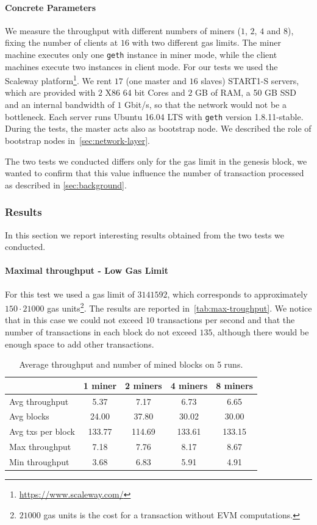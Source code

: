 \paragraph{Concrete Parameters}
We measure the throughput with different numbers of miners ($1$, $2$, $4$ and
$8$), fixing the number of clients at $16$ with two different gas limits. The
miner machine executes only one \texttt{geth} instance in miner mode, while the
client machines execute two instances in client mode. For our tests we used the
Scaleway platform\footnote{\url{https://www.scaleway.com/}}. We rent $17$ (one
master and $16$ slaves) START1-S servers, which are provided with $2$ X86 64 bit
Cores and $2$ GB of RAM, a 50 GB SSD and an internal bandwidth of $1$ Gbit/s, so
that the network would not be a bottleneck. Each server runs Ubuntu 16.04 LTS
with \texttt{geth} version 1.8.11-stable. During the tests, the master acts also
as bootstrap node. We described the role of bootstrap nodes
in~\autoref{sec:network-layer}.

The two tests we conducted differs only for the gas limit in the genesis block,
we wanted to confirm that this value influence the number of transaction
processed as described in \autoref{sec:background}.


\subsubsection{Results}

In this section we report interesting results obtained from the two tests we
conducted.

\paragraph{Maximal throughput - Low Gas Limit}
\label{sec:max-troughput}
For this test we used a gas limit of $3141592$, which corresponds to
approximately $150 \cdot 21000$ gas units\footnote{$21000$ gas units is the cost
for a transaction without EVM computations.}. The results are reported
in~\autoref{tab:max-troughput}. We notice that in this case we could not exceed
$10$ transactions per second and that the number of transactions in each
block do not exceed $135$, although there would be enough space to add other
transactions.

\begin{table}[h!]
  \centering
  \begin{tabular}{l | cccc}
    & 1 miner & 2 miners & 4 miners & 8 miners \\ \hline
    Avg throughput & 5.37 & 7.17 & 6.73 & 6.65 \\
    Avg blocks & 24.00 & 37.80 & 30.02 & 30.00 \\
    Avg txs per block & 133.77 & 114.69 & 133.61 & 133.15 \\
    Max throughput & 7.18 & 7.76 & 8.17 & 8.67 \\
    Min throughput & 3.68 & 6.83 & 5.91 & 4.91 \\
  \end{tabular}
  \caption{Average throughput and number of mined blocks on 5 runs.}
  \label{tab:max-troughput}
\end{table}


